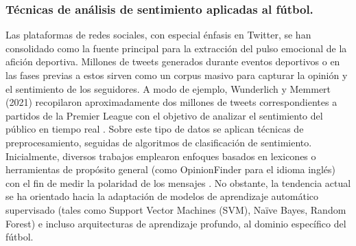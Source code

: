 


\subsubsection{Técnicas de análisis de sentimiento aplicadas al fútbol.}

Las plataformas de redes sociales, con especial énfasis en Twitter, se han consolidado como la fuente principal para la extracción del pulso emocional de la afición deportiva. Millones de tweets generados durante eventos deportivos o en las fases previas a estos sirven como un corpus masivo para capturar la opinión y el sentimiento de los seguidores. A modo de ejemplo, Wunderlich y Memmert (2021) recopilaron aproximadamente dos millones de tweets correspondientes a partidos de la Premier League con el objetivo de analizar el sentimiento del público en tiempo real \cite{Wunderlich2022}. Sobre este tipo de datos se aplican técnicas de preprocesamiento, seguidas de algoritmos de clasificación de sentimiento. Inicialmente, diversos trabajos emplearon enfoques basados en lexicones o herramientas de propósito general (como OpinionFinder para el idioma inglés) con el fin de medir la polaridad de los mensajes \cite{Schumaker2016}. No obstante, la tendencia actual se ha orientado hacia la adaptación de modelos de aprendizaje automático supervisado (tales como Support Vector Machines (SVM), Naïve Bayes, Random Forest) e incluso arquitecturas de aprendizaje profundo, al dominio específico del fútbol.\\

